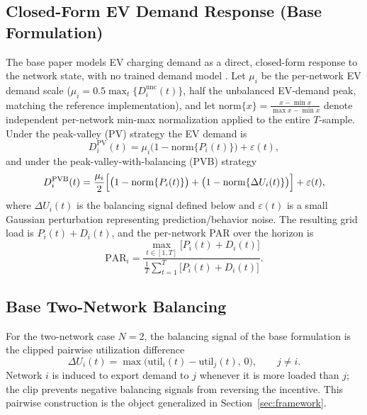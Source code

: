 \documentclass[10pt,journal]{IEEEtran}
\newcommand{\D}{\Delta}
\newcommand{\util}{\mathrm{util}}
\newcommand{\norm}[1]{\mathrm{norm}\{#1\}}
\begin{document}
\subsection{Closed-Form EV Demand Response (Base Formulation)}
The base paper models EV charging demand as a direct, closed-form response
to the network state, with no trained demand model
\cite{lepolesa2026}. Let $\mu_i$ be the per-network EV demand scale
($\mu_i=0.5\max_t\{D_i^{\mathrm{unc}}(t)\}$, half the unbalanced EV-demand
peak, matching the reference implementation), and let
$\norm{x}=\tfrac{x-\min x}{\max x-\min x}$ denote independent per-network
min-max normalization applied to the entire $T$-sample. Under the
peak-valley (PV) strategy the EV demand is
\begin{equation}\label{eq:drpv}
  D_i^{\mathrm{PV}}(t)=\mu_i\bigl(1-\norm{P_i(t)}\bigr)+\varepsilon(t),
\end{equation}
and under the peak-valley-with-balancing (PVB) strategy
\begin{equation}\label{eq:drpvb}
  D_i^{\mathrm{PVB}}(t)=\frac{\mu_i}{2}\Bigl[
    \bigl(1-\norm{P_i(t)}\bigr)
    +\bigl(1-\norm{\D U_i(t)}\bigr)\Bigr]+\varepsilon(t),
\end{equation}
where $\D U_i(t)$ is the balancing signal defined below and
$\varepsilon(t)$ is a small Gaussian perturbation representing
prediction/behavior noise. The resulting grid load is
$P_i(t)+D_i(t)$, and the per-network PAR over the horizon is
\begin{equation}\label{eq:par}
  \mathrm{PAR}_i=
  \frac{\max_{t\in[1,T]}\bigl[P_i(t)+D_i(t)\bigr]}
  {\frac{1}{T}\sum_{t=1}^{T}\bigl[P_i(t)+D_i(t)\bigr]}.
\end{equation}

\subsection{Base Two-Network Balancing}
For the two-network case $N{=}2$, the balancing signal of the base
formulation is the clipped pairwise utilization difference
\begin{equation}\label{eq:pairwise}
  \D U_{i}(t)=\max\bigl(\util_i(t)-\util_j(t),\,0\bigr),\qquad j\ne i.
\end{equation}
Network $i$ is induced to export demand to $j$ whenever it is more loaded
than $j$; the clip prevents negative balancing signals from reversing the
incentive. This pairwise construction is the object generalized in
Section~\ref{sec:framework}.
\end{document}
